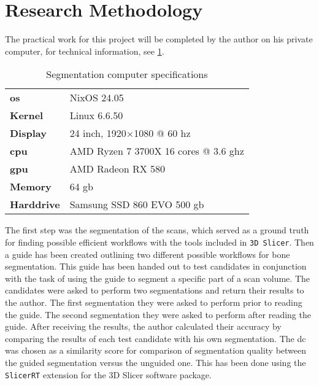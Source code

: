 \section{Research Methodology}\label{s:introduction-researchmethodology}
The practical work for this project will be completed by the author on his private computer, for technical information, see \cref{t:computer-specs}.
\begin{table}[ht]
	\centering
	\begin{tabular}{l l}
		\textbf{\acrshort{os}}  & NixOS 24.05                                     \\
		\textbf{Kernel}         & Linux 6.6.50                                    \\
		\textbf{Display}        & 24 inch, 1920$\times$1080 @ 60 \acrshort{hz}    \\
		\textbf{\acrshort{cpu}} & AMD Ryzen 7 3700X 16 cores @ 3.6 \acrshort{ghz} \\
		\textbf{\acrshort{gpu}} & AMD Radeon RX 580                               \\
		\textbf{Memory}         & 64 \acrshort{gb}                                \\
		\textbf{Harddrive}      & Samsung SSD 860 EVO 500 \acrshort{gb}
	\end{tabular}
	\caption{Segmentation computer specifications}\label{t:computer-specs}
\end{table}

\noindent
The first step was the segmentation of the \mct\space scans, which served as a ground truth for finding possible efficient workflows with the tools included in \texttt{3D Slicer}.
Then a guide has been created outlining two different possible workflows for bone segmentation.
This guide has been handed out to test candidates in conjunction with the task of using the guide to segment a specific part of a scan volume.
The candidates were asked to perform two segmentations and return their results to the author.
The first segmentation they were asked to perform prior to reading the guide.
The second segmentation they were asked to perform after reading the guide.
After receiving the results, the author calculated their accuracy by comparing the results of each test candidate with his own segmentation.
The \acrfull{dc} \cite{diceMeasuresAmountEcologic1945} was chosen as a similarity score for comparison of segmentation quality between the guided segmentation versus the unguided one.
This has been done using the \texttt{SlicerRT} \cite{pinterSlicerRTRadiationTherapy2012} extension for the 3D Slicer software package.


